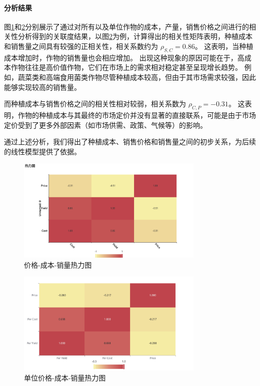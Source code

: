 \documentclass[12pt,a4paper]{nmmcm}
\begin{document}
\paragraph{分析结果}

图\ref{fig:heatmap}和\ref{fig:heatmap2}分别展示了通过对所有以及单位作物的成本，产量，销售价格之间进行的相关性分析得到的关联度结果，以图\ref{fig:heatmap2}为例，计算得出的相关性矩阵表明，种植成本和销售量之间具有较强的正相关性，相关系数约为 $\rho_{S,C} = 0.86$。
这表明，当种植成本增加时，作物的销售量也会相应增加。
出现这种现象的原因可能在于，高成本作物往往是高价值作物，它们在市场上的需求相对稳定甚至呈现增长趋势。
例如，蔬菜类和高端食用菌类作物尽管种植成本较高，但由于其市场需求较强，因此能够实现较高的销售量。

而种植成本与销售价格之间的相关性相对较弱，相关系数为 $\rho_{C,P} = -0.31$。
这表明，作物的种植成本与其最终的市场定价并没有显著的直接联系，可能是由于市场定价受到了更多外部因素（如市场供需、政策、气候等）的影响。

通过上述分析，我们得出了种植成本、销售价格和销售量之间的初步关系，为后续的线性模型提供了依据。


\begin{figure}[H]
  \centering
  \includegraphics[width=0.8\textwidth]{figures/prob3/correlation/价格_成本_销量热力图.png}
  \caption{价格-成本-销量热力图}
  \label{fig:heatmap}
\end{figure}

\begin{figure}[H]
  \centering
  \includegraphics[width=0.8\textwidth]{figures/prob3/correlation/单位价格_成本_销量热力图.png}
  \caption{单位价格-成本-销量热力图}
  \label{fig:heatmap2}
\end{figure}
\end{document}
